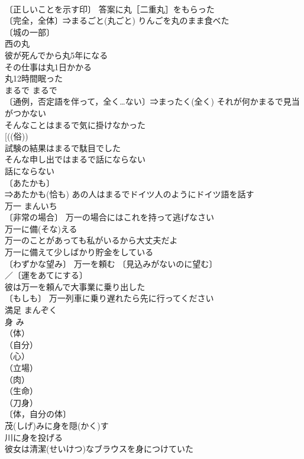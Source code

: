 \documentclass[8pt]{extreport}
\begin{document}
\begin{CJK}{UTF8}{min}
\\	〔正しいことを示す印〕 答案に丸［二重丸］をもらった 
\\	〔完全，全体〕⇒まるごと(丸ごと) りんごを丸のまま食べた 
\\	〔城の一部〕　
\\	西の丸 
\\	彼が死んでから丸5年になる 
\\	その仕事は丸1日かかる 
\\	丸12時間眠った 
\\	まるで	まるで	
\\	〔通例，否定語を伴って，全く…ない〕⇒まったく(全く) それが何かまるで見当がつかない 
\\	そんなことはまるで気に掛けなかった 
\\	[((俗)) 
\\	試験の結果はまるで駄目でした 
\\	そんな申し出ではまるで話にならない 
\\	話にならない 
\\	〔あたかも〕
\\	⇒あたかも(恰も) あの人はまるでドイツ人のようにドイツ語を話す 
\\	万一	まんいち	
\\	〔非常の場合〕 万一の場合にはこれを持って逃げなさい 
\\	万一に備(そな)える 
\\	万一のことがあっても私がいるから大丈夫だよ 
\\	万一に備えて少しばかり貯金をしている 
\\	〔わずかな望み〕 万一を頼む 〔見込みがないのに望む〕
\\	／〔運をあてにする〕
\\	彼は万一を頼んで大事業に乗り出した 
\\	〔もしも〕 万一列車に乗り遅れたら先に行ってください 
\\	満足	まんぞく	
\\	身	み	
\\	（体）
\\	（自分）
\\	（心）
\\	（立場）
\\	（肉）
\\	（生命）
\\	（刀身）
\\	〔体，自分の体〕
\\	茂(しげ)みに身を隠(かく)す 
\\	川に身を投げる 
\\	彼女は清潔(せいけつ)なブラウスを身につけていた 

\end{CJK}
\end{document}

